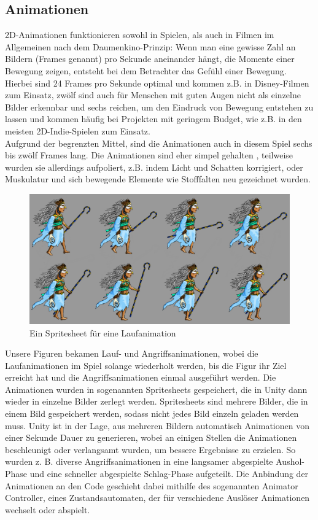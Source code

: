 \documentclass[extern,palatino]{cgBA}
\begin{document}
\subsection{Animationen}\label{ani}
2D-Animationen funktionieren sowohl in Spielen, als auch in Filmen im Allgemeinen nach dem Daumenkino-Prinzip: Wenn man eine gewisse Zahl an Bildern (Frames genannt) pro Sekunde aneinander hängt, die Momente einer Bewegung zeigen, entsteht bei dem Betrachter das Gefühl einer Bewegung. Hierbei sind 24 Frames pro Sekunde optimal und kommen z.B. in Disney-Filmen zum Einsatz, zwölf sind auch für Menschen mit guten Augen nicht als einzelne Bilder erkennbar und sechs reichen, um den Eindruck von Bewegung entstehen zu lassen und kommen häufig bei Projekten mit geringem Budget, wie z.B. in den meisten 2D-Indie-Spielen zum Einsatz. %
\\Aufgrund der begrenzten Mittel, sind die Animationen auch in diesem Spiel sechs bis zwölf Frames lang. Die Animationen sind eher simpel gehalten%
, teilweise wurden sie allerdings aufpoliert, z.B. indem Licht und Schatten korrigiert, oder Muskulatur und sich bewegende Elemente wie Stofffalten neu gezeichnet wurden.\\
\begin{figure}[H]
	\centering
	\includegraphics[width=1\textwidth]{move.jpg}
	\caption{Ein Spritesheet für eine Laufanimation}
\end{figure}
Unsere Figuren bekamen Lauf- und Angriffsanimationen, wobei die Laufanimationen im Spiel solange wiederholt werden, bis die Figur ihr Ziel erreicht hat und die Angriffsanimationen einmal ausgeführt werden. Die Animationen wurden in sogenannten Spritesheets gespeichert, die in Unity dann wieder in einzelne Bilder zerlegt werden. Spritesheets sind mehrere Bilder, die in einem Bild gespeichert werden, sodass nicht jedes Bild einzeln geladen werden muss. Unity ist in der Lage, aus mehreren Bildern automatisch Animationen von einer Sekunde Dauer zu generieren, wobei an einigen Stellen die Animationen beschleunigt oder verlangsamt wurden, um bessere Ergebnisse zu erzielen. So wurden z. B. diverse Angriffsanimationen in eine langsamer abgespielte Aushol-Phase und eine schneller abgespielte Schlag-Phase aufgeteilt. Die Anbindung der Animationen an den Code geschieht dabei mithilfe des sogenannten Animator Controller, eines Zustandsautomaten, der für verschiedene Auslöser Animationen wechselt oder abspielt.
\end{document}
